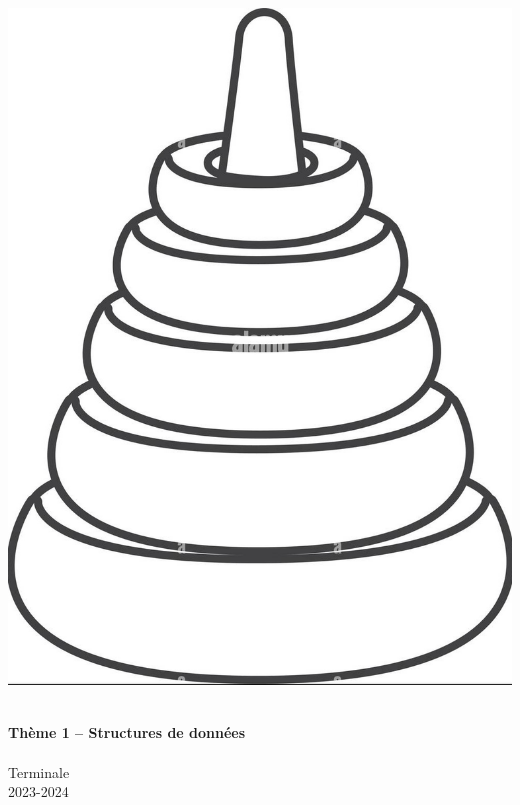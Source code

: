 \begin{titlepage}
\begin{minipage}{0.4\linewidth}
    \includegraphics[scale=0.08]{hanoi.jpg}
\end{minipage}

\HRule \\[0.4cm]
{ \huge \bfseries Thème 1 – Structures de données \\[0.15cm] }
\HRule \\[1.5cm]
Terminale
\\[1cm]
2023-2024 \\ [1cm]
\end{titlepage}